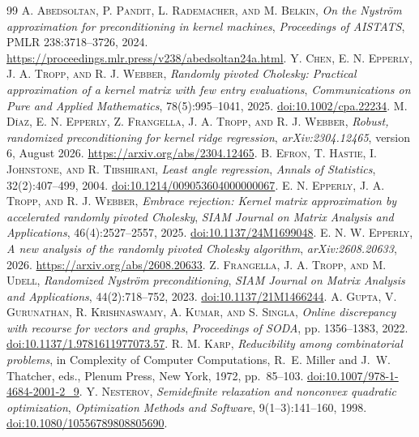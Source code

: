 \documentclass[final,leqno,letterpaper]{etna}
\begin{document}
\begin{thebibliography}{99}
 \textsc{A. Abedsoltan, P. Pandit, L. Rademacher, and M. Belkin}, \emph{On the Nystr\"om approximation for preconditioning in kernel machines}, \emph{Proceedings of AISTATS}, PMLR 238:3718--3726, 2024. \url{https://proceedings.mlr.press/v238/abedsoltan24a.html}.
 \textsc{Y. Chen, E. N. Epperly, J. A. Tropp, and R. J. Webber}, \emph{Randomly pivoted Cholesky: Practical approximation of a kernel matrix with few entry evaluations}, \emph{Communications on Pure and Applied Mathematics}, 78(5):995--1041, 2025. \href{https://doi.org/10.1002/cpa.22234}{doi:10.1002/cpa.22234}.
 \textsc{M. D\'iaz, E. N. Epperly, Z. Frangella, J. A. Tropp, and R. J. Webber}, \emph{Robust, randomized preconditioning for kernel ridge regression}, \emph{arXiv:2304.12465}, version 6, August 2026. \url{https://arxiv.org/abs/2304.12465}.
 \textsc{B. Efron, T. Hastie, I. Johnstone, and R. Tibshirani}, \emph{Least angle regression}, \emph{Annals of Statistics}, 32(2):407--499, 2004. \href{https://doi.org/10.1214/009053604000000067}{doi:10.1214/009053604000000067}.
 \textsc{E. N. Epperly, J. A. Tropp, and R. J. Webber}, \emph{Embrace rejection: Kernel matrix approximation by accelerated randomly pivoted Cholesky}, \emph{SIAM Journal on Matrix Analysis and Applications}, 46(4):2527--2557, 2025. \href{https://doi.org/10.1137/24M1699048}{doi:10.1137/24M1699048}.
 \textsc{E. N. W. Epperly}, \emph{A new analysis of the randomly pivoted Cholesky algorithm}, \emph{arXiv:2608.20633}, 2026. \url{https://arxiv.org/abs/2608.20633}.
 \textsc{Z. Frangella, J. A. Tropp, and M. Udell}, \emph{Randomized Nystr\"om preconditioning}, \emph{SIAM Journal on Matrix Analysis and Applications}, 44(2):718--752, 2023. \href{https://doi.org/10.1137/21M1466244}{doi:10.1137/21M1466244}.
 \textsc{A. Gupta, V. Gurunathan, R. Krishnaswamy, A. Kumar, and S. Singla}, \emph{Online discrepancy with recourse for vectors and graphs}, \emph{Proceedings of SODA}, pp. 1356--1383, 2022. \href{https://doi.org/10.1137/1.9781611977073.57}{doi:10.1137/1.9781611977073.57}.
 \textsc{R. M. Karp}, \emph{Reducibility among combinatorial problems}, in Complexity of Computer Computations, R.~E. Miller and J.~W. Thatcher, eds., Plenum Press, New York, 1972, pp.~85--103. \href{https://doi.org/10.1007/978-1-4684-2001-2_9}{doi:10.1007/978-1-4684-2001-2\_9}.
 \textsc{Y. Nesterov}, \emph{Semidefinite relaxation and nonconvex quadratic optimization}, \emph{Optimization Methods and Software}, 9(1--3):141--160, 1998. \href{https://doi.org/10.1080/10556789808805690}{doi:10.1080/10556789808805690}.

\end{thebibliography}
\end{document}
